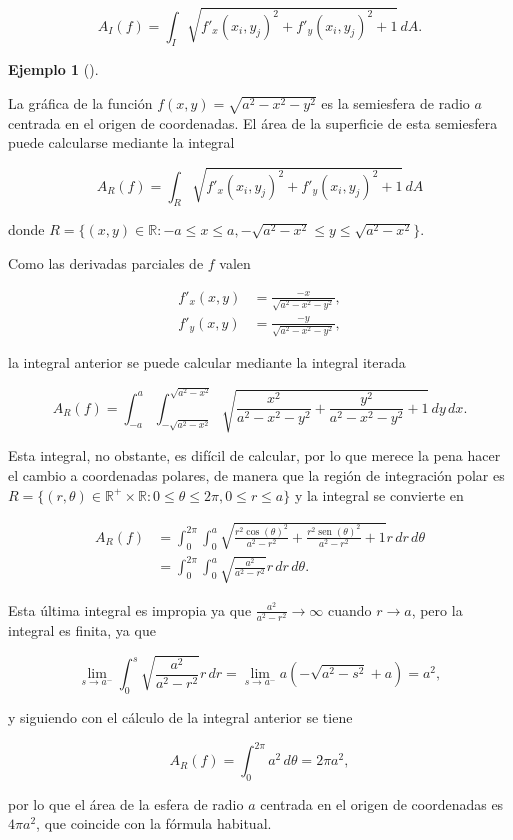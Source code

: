 \documentclass[
  a4paper,
]{scrreport}
\theoremstyle{definition}
\theoremstyle{definition}
\newtheorem{example}{Ejemplo}[chapter]
\theoremstyle{definition}
\theoremstyle{plain}
\theoremstyle{plain}
\theoremstyle{plain}
\theoremstyle{remark}
\begin{document}
\[
A_I(f) = \int_I \sqrt{f'_x(x_i,y_j)^2 + f'_y(x_i,y_j)^2 + 1}\,dA.
\]

\begin{example}[]\protect\hypertarget{exm-área-superficie-semi-esfera}{}\label{exm-área-superficie-semi-esfera}

La gráfica de la función \(f(x,y)=\sqrt{a^2-x^2-y^2}\) es la semiesfera
de radio \(a\) centrada en el origen de coordenadas. El área de la
superficie de esta semiesfera puede calcularse mediante la integral

\[
A_R(f) = \int_R \sqrt{f'_x(x_i,y_j)^2 + f'_y(x_i,y_j)^2 + 1}\,dA
\]

donde
\(R=\{(x,y)\in \mathbb{R}: -a\leq x\leq a, -\sqrt{a^2-x^2}\leq y\leq \sqrt{a^2-x^2}\}\).

Como las derivadas parciales de \(f\) valen

\begin{align*}
f'_x(x,y) &= \frac{-x}{\sqrt{a^2-x^2-y^2}}, \\
f'_y(x,y) &= \frac{-y}{\sqrt{a^2-x^2-y^2}},
\end{align*}

la integral anterior se puede calcular mediante la integral iterada

\[
A_R(f) = \int_{-a}^a \int_{-\sqrt{a^2-x^2}}^{\sqrt{a^2-x^2}} \sqrt{\frac{x^2}{a^2-x^2-y^2} + \frac{y^2}{a^2-x^2-y^2} + 1}\,dy\,dx.
\]

Esta integral, no obstante, es difícil de calcular, por lo que merece la
pena hacer el cambio a coordenadas polares, de manera que la región de
integración polar es
\(R=\{(r,\theta)\in \mathbb{R}^+\times \mathbb{R}: 0\leq \theta\leq 2\pi, 0\leq r\leq a\}\)
y la integral se convierte en

\begin{align*}
A_R(f) 
&= \int_0^{2\pi} \int_0^a \sqrt{\frac{r^2\cos(\theta)^2}{a^2-r^2}+\frac{r^2\operatorname{sen}(\theta)^2}{a^2-r^2}+1}r\,dr\,d\theta \\
&= \int_0^{2\pi} \int_0^a \sqrt{\frac{a^2}{a^2-r^2}}r\,dr\,d\theta.
\end{align*}

Esta última integral es impropia ya que
\(\frac{a^2}{a^2-r^2}\to \infty\) cuando \(r\to a\), pero la integral es
finita, ya que

\[
\lim_{s\to a^-}\int_0^s \sqrt{\frac{a^2}{a^2-r^2}} r\,dr
= \lim_{s\to a^-} a(-\sqrt{a^2-s^2}+a) = a^2,
\]

y siguiendo con el cálculo de la integral anterior se tiene

\[
A_R(f)
= \int_0^{2\pi} a^2\,d\theta
= 2\pi a^2,
\]

por lo que el área de la esfera de radio \(a\) centrada en el origen de
coordenadas es \(4\pi a^2\), que coincide con la fórmula habitual.

\end{example}
\end{document}
